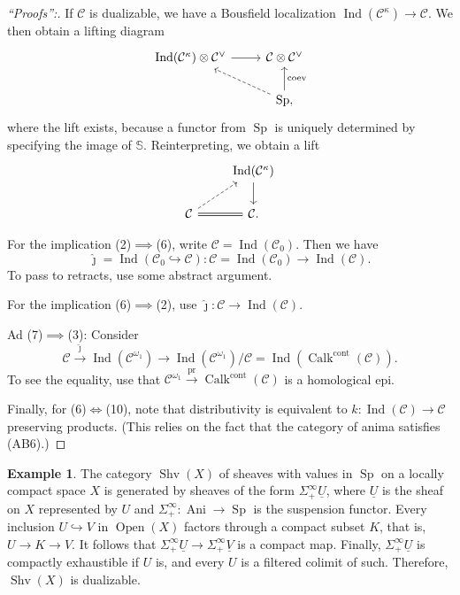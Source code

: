 \documentclass[draft]{amsart}
\renewcommand{\SS}{\mathbb{S}}
\newcommand{\jhat}{\hat\jmath}
\newcommand{\ul}[1]{\underline{#1}}
\newcommand{\cat}[1]{\mathcal{#1}}
\newcommand{\injto}{\mathbin{\hookrightarrow}}
\DeclareMathOperator{\Anima}{Ani}
\DeclareMathOperator{\Ind}{Ind}
\DeclareMathOperator{\Open}{Open}
\DeclareMathOperator{\Shv}{Shv}
\DeclareMathOperator{\Sp}{Sp}
\DeclareMathOperator{\Calk}{Calk}
\theoremstyle{definition}
\newtheorem{ex}[thm]{Example}
\begin{document}
\begin{proof}[\enquote{Proofs}:]
If $\cat C$ is dualizable, we have a Bousfield localization $\Ind(\cat C^\kappa)\to \cat C$. We then obtain a lifting diagram
\[
\begin{tikzcd}
\Ind(\cat C^\kappa) \otimes \cat C^\vee \ar[r] & \cat C\otimes \cat C^\vee \\
& \Sp \ar[u,"\text{coev}"'] \ar[ul,dashed],
\end{tikzcd}
\]
where the lift exists, because a functor from $\Sp$ is uniquely determined by specifying the image of $\SS$. Reinterpreting, we obtain a lift
\[
\begin{tikzcd}
& \Ind(\cat C^\kappa) \ar[d] \\
\cat C \ar[ur,dashed] \ar[r,equals] & \cat C.
\end{tikzcd}
\]

For the implication (2)$\implies$(6), write $\cat C = \Ind(\cat C_0)$. Then we have
\[
\jhat = \Ind(\cat C_0\injto \cat C) \colon \cat C = \Ind(\cat C_0)\to \Ind(\cat C).
\]
To pass to retracts, use some abstract argument.

For the implication (6)$\implies$(2), use $\jhat\colon \cat C \to \Ind(\cat C)$.

Ad (7)$\implies$(3): Consider 
\[
\cat C \xrightarrow{\jhat} \Ind(\cat C^{\omega_1}) \to \Ind(\cat C^{\omega_1})/\cat C = \Ind(\Calk^{\mathrm{cont}}(\cat C)).
\]
To see the equality, use that $\cat C^{\omega_1} \xrightarrow{\mathrm{pr}} \Calk^{\mathrm{cont}}(\cat C)$ is a homological epi.

Finally, for (6)$\iff$(10), note that distributivity is equivalent to $k\colon \Ind(\cat C)\to \cat C$ preserving products. (This relies on the fact that the category of anima satisfies (AB6).)
\end{proof}

\begin{ex}
The category $\Shv(X)$ of sheaves with values in $\Sp$ on a locally compact space $X$ is generated by sheaves of the form $\Sigma^\infty_+ \ul{U}$, where $\ul U$ is the sheaf on $X$ represented by $U$ and $\Sigma^\infty_+\colon \Anima \to \Sp$ is the suspension functor. Every inclusion $U \injto V$ in $\Open(X)$ factors through a compact subset $K$, that is, $U \to K\to V$. It follows that $\Sigma^\infty_+ \ul{U} \to \Sigma^\infty_+\ul{V}$ is a compact map. Finally, $\Sigma^\infty_+\ul{U}$ is compactly exhaustible if $U$ is, and every $U$ is a filtered colimit of such. Therefore, $\Shv(X)$ is dualizable.
\end{ex}
\end{document}

